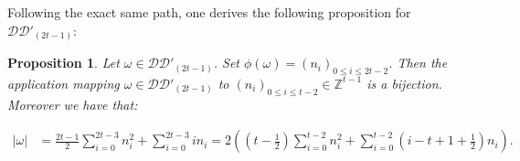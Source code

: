 \documentclass[11pt,letterpaper]{amsart}
\def\bbbz{\mathbb Z}
\def\ccdd{\mathcal {DD}}
\newtheorem{prop}[df]{Proposition}		%
\numberwithin{equation}{section}
\numberwithin{df}{section}
\begin{document}
%

Following the exact same path, one derives the following proposition for $\ccdd'_{(2t-1)}$:
\begin{prop}\label{prop:ddprime2t-1core}
Let $\omega\in \ccdd'_{(2t-1)}$. Set $\phi(\omega)=(n_i)_{0\leq i\leq 2t-2}$. Then the application mapping $\omega\in\ccdd'_{(2t-1)}$ to $(n_i)_{0\leq i\leq t-2}\in\mathbb{Z}^{t-1}$ is a bijection. Moreover we have that:

\begin{align}
\lvert \omega \rvert &=\frac{2t-1}{2}\sum_{i=0}^{2t-3}n_i^2+\sum_{i=0}^{2t-3}in_i=2\left(\left(t-\frac{1}{2}\right)\sum_{i=0}^{t-2}n_i^2+\sum_{i=0}^{t-2}\left(i-t+1+\frac{1}{2}\right)n_i\right).\label{eq:gkddprimeimpair}
\end{align}

\end{prop}

%
\end{document}
